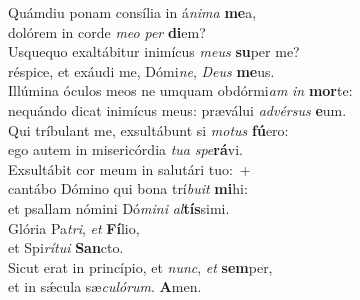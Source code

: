\evenverse Quámdiu ponam consília in á\textit{ni}\textit{ma} \textbf{me}a,~\*\\
\evenverse dolórem in corde \textit{me}\textit{o} \textit{per} \textbf{di}em?\\
\oddverse Usquequo exaltábitur inimícus \textit{me}\textit{us} \textbf{su}per me?~\*\\
\oddverse réspice, et exáudi me, Dómi\textit{ne}, \textit{De}\textit{us} \textbf{me}us.\\
\evenverse Illúmina óculos meos ne umquam obdórmi\textit{am} \textit{in} \textbf{mor}te:~\*\\
\evenverse nequándo dicat inimícus meus: præválui \textit{ad}\textit{vér}\textit{sus} \textbf{e}um.\\
\oddverse Qui tríbulant me, exsultábunt si \textit{mo}\textit{tus} \textbf{fú}ero:~\*\\
\oddverse ego autem in misericórdia \textit{tu}\textit{a} \textit{spe}\textbf{rá}vi.\\
\evenverse Exsultábit cor meum in salutári tuo:~+\\
\evenverse  cantábo Dómino qui bona trí\textit{bu}\textit{it} \textbf{mi}hi:~\*\\
\evenverse et psallam nómini Dó\textit{mi}\textit{ni} \textit{al}\textbf{tís}simi.\\
\oddverse Glória Pa\textit{tri}, \textit{et} \textbf{Fí}lio,~\*\\
\oddverse et Spi\textit{rí}\textit{tu}\textit{i} \textbf{San}cto.\\
\evenverse Sicut erat in princípio, et \textit{nunc}, \textit{et} \textbf{sem}per,~\*\\
\evenverse et in sǽcula sæ\textit{cu}\textit{ló}\textit{rum}. \textbf{A}men.\\

